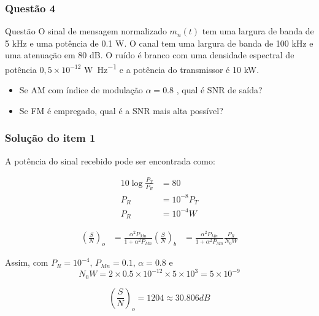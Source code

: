 \documentclass[aspectratio=169,dvipsnames]{beamer}
\begin{document}
\begin{frame}
  \frametitle{Questão 4}

  \begin{block}{Questão}
    O sinal de mensagem normalizado $m_n(t)$ tem uma largura de banda de 
    5 \si{\kilo \hertz} e uma potência de 0.1 \si{\watt}. O canal tem uma largura 
    de banda de 100 \si{\kilo \hertz} e uma atenuação em 80 dB. O ruído é branco com
    uma densidade espectral de potência $0,5 \times 10^{-12}$ \si{\watt \per \hertz} e a potência do transmissor é 
    10 \si{\kilo \watt}.  

    \begin{itemize}
      \item Se AM com índice de modulação $\alpha = 0.8$ , qual é  SNR de saída?
      \item Se FM é empregado, qual é a SNR mais alta possível?
    \end{itemize}

  \end{block}
  
\end{frame}


\begin{frame}
  \frametitle{Solução do item 1}
   A potência do sinal recebido pode ser encontrada como: 

  \begin{align*}
  10\log{\frac{P_T}{P_R}} &= 80\\
  P_R &= 10^{-8}P_T\\
  P_R &= 10^{-4} W 
  \end{align*}
  
  
  \begin{align*}
  \left(\frac{S}{N}\right)_o &= \frac{ \alpha^2 P_{Mn}}{1 + \alpha^2 P_{Mn}} \left(\frac{S}{N}\right)_b
  &= \frac{ \alpha^2 P_{Mn}}{1 + \alpha^2 P_{Mn}} \frac{P_R}{N_0W}
  \end{align*}
  

  Assim, com $P_R = 10^{-4}$, $P_{Mn} = 0.1$, $\alpha = 0.8$ e $$N_0W = 2 \times 0.5 \times 10^{-12} \times 5 \times 10^3 = 5 \times 10^{-9}$$
\vspace*{-1cm}

$$ \left(\frac{S}{N}\right)_o = 1204 \approx 30.806 dB $$

\end{frame}
\end{document}
